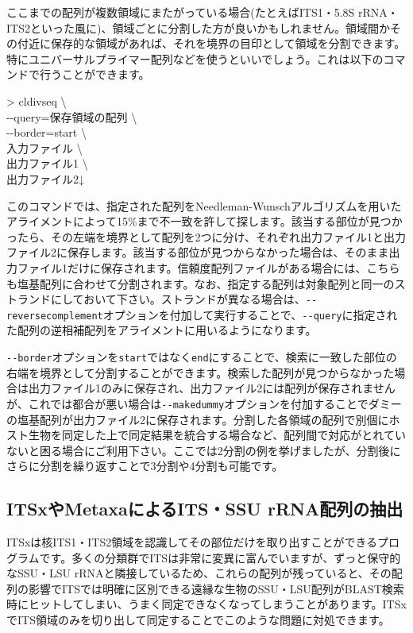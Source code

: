 \documentclass[titlepage,10pt,a4paper]{jsbook}
\newenvironment{cmd}{\begin{oframed}\raggedright\ttfamily\footnotesize\setlength{\baselineskip}{1.4em}}{\end{oframed}\vspace{-1em}}
\begin{document}
ここまでの配列が複数領域にまたがっている場合(たとえばITS1・5.8S rRNA・ITS2といった風に)、領域ごとに分割した方が良いかもしれません。領域間かその付近に保存的な領域があれば、それを境界の目印として領域を分割できます。特にユニバーサルプライマー配列などを使うといいでしょう。これは以下のコマンドで行うことができます。
\begin{cmd}
{\textgreater} cldivseq {\textbackslash}\\
{-}{-}query=保存領域の配列 {\textbackslash}\\
{-}{-}border=start {\textbackslash}\\
入力ファイル {\textbackslash}\\
出力ファイル1 {\textbackslash}\\
出力ファイル2↓
\end{cmd}
このコマンドでは、指定された配列をNeedleman-Wunschアルゴリズムを用いたアライメントによって15\%まで不一致を許して探します。該当する部位が見つかったら、その左端を境界として配列を2つに分け、それぞれ出力ファイル1と出力ファイル2に保存します。該当する部位が見つからなかった場合は、そのまま出力ファイル1だけに保存されます。信頼度配列ファイルがある場合には、こちらも塩基配列に合わせて分割されます。なお、指定する配列は対象配列と同一のストランドにしておいて下さい。ストランドが異なる場合は、\texttt{{-}{-}reversecomplement}オプションを付加して実行することで、\texttt{{-}{-}query}に指定された配列の逆相補配列をアライメントに用いるようになります。

\texttt{{-}{-}border}オプションを\texttt{start}ではなく\texttt{end}にすることで、検索に一致した部位の右端を境界として分割することができます。検索した配列が見つからなかった場合は出力ファイル1のみに保存され、出力ファイル2には配列が保存されませんが、これでは都合が悪い場合は\texttt{{-}{-}makedummy}オプションを付加することでダミーの塩基配列が出力ファイル2に保存されます。分割した各領域の配列で別個にホスト生物を同定した上で同定結果を統合する場合など、配列間で対応がとれていないと困る場合にご利用下さい。ここでは2分割の例を挙げましたが、分割後にさらに分割を繰り返すことで3分割や4分割も可能です。

\subsection{ITSxやMetaxaによるITS・SSU rRNA配列の抽出}

ITSxは核ITS1・ITS2領域を認識してその部位だけを取り出すことができるプログラムです\citep{Bengtsson2013}。多くの分類群でITSは非常に変異に富んでいますが、ずっと保守的なSSU・LSU rRNAと隣接しているため、これらの配列が残っていると、その配列の影響でITSでは明確に区別できる遠縁な生物のSSU・LSU配列がBLAST検索時にヒットしてしまい、うまく同定できなくなってしまうことがあります。ITSxでITS領域のみを切り出して同定することでこのような問題に対処できます。
\end{document}

